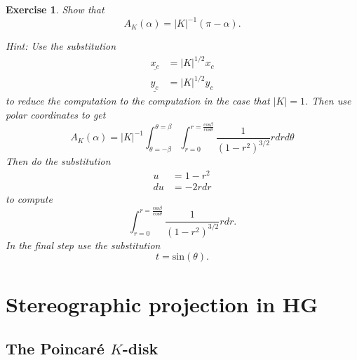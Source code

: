 \documentclass{article}%
\newtheorem{exercise}[theorem]{Exercise}
\begin{document}
\begin{exercise}
\label{97}Show that%
\[
A_{K}\left(  \alpha\right)  =\left\vert K\right\vert ^{-1}\left(  \pi
-\alpha\right)  .
\]


Hint: Use the substitution%
\begin{align*}
\underline{x_{c}}  &  =\left\vert K\right\vert ^{1/2}x_{c}\\
\underline{y_{c}}  &  =\left\vert K\right\vert ^{1/2}y_{c}%
\end{align*}
to reduce the computation to the computation in the case that $\left\vert
K\right\vert =1$. Then use polar coordinates to get
\[
A_{K}\left(  \alpha\right)  =\left\vert K\right\vert ^{-1}%
{\displaystyle\int\nolimits_{\theta=-\beta}^{\theta=\beta}}
{\displaystyle\int\nolimits_{r=0}^{r=\frac{\mathrm{cos}\beta}{\mathrm{cos}%
\theta}}}
\frac{1}{\left(  1-r^{2}\right)  ^{3/2}}rdrd\theta
\]
Then do the substitution%
\begin{align*}
u  &  =1-r^{2}\\
du  &  =-2rdr
\end{align*}
to compute
\[%
{\displaystyle\int\nolimits_{r=0}^{r=\frac{\mathrm{cos}\beta}{\mathrm{cos}%
\theta}}}
\frac{1}{\left(  1-r^{2}\right)  ^{3/2}}rdr.
\]
In the final step use the substitution%
\[
t=\mathrm{sin}\left(  \theta\right)  .
\]
\pagebreak
\end{exercise}

\section{Stereographic projection in \textbf{HG}}

\subsection{The Poincar\'{e} $K$-disk}
\end{document}
